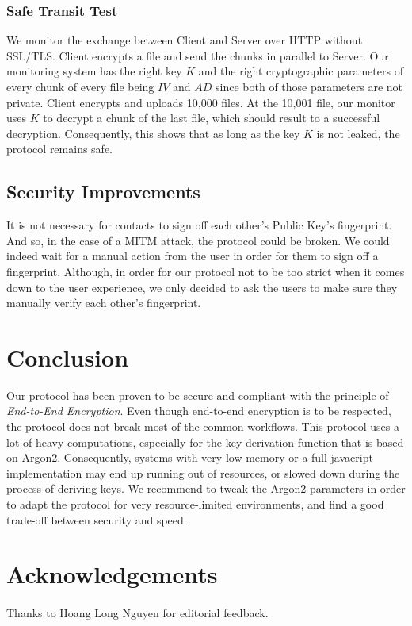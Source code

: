 \documentclass[a4paper,9pt,twoside]{article}
\begin{document}
\subsubsection{Safe Transit Test}

    We monitor the exchange between Client and Server over HTTP without SSL/TLS. Client encrypts 
a file and send the chunks in parallel to Server. Our monitoring system has the right key $K$ and the right 
cryptographic parameters of every chunk of every file being $IV$ and $AD$ since both of those parameters are not private. Client 
encrypts and uploads 10,000 files. At the 10,001 file, our monitor uses $K$ to decrypt a chunk of the last file, 
which should result to a successful decryption. Consequently, this shows that as long as the key $K$ is not leaked, 
the protocol remains safe.

\subsection{Security Improvements}

    It is not necessary for contacts to sign off each other's Public Key's fingerprint. And so, in the case of a 
MITM attack, the protocol could be broken. We could indeed wait for a manual action 
from the user in order for them to sign off a fingerprint. Although, in order for our protocol not to be 
too strict when it comes down to the user experience, we only decided to ask the users to make sure 
they manually verify each other's fingerprint.

\section{Conclusion}

    Our protocol has been proven to be secure and compliant with the principle of 
\emph{End-to-End Encryption}. Even though end-to-end encryption is to be 
respected, the protocol does not break most of the common workflows. This protocol 
uses a lot of heavy computations, especially for the key derivation function that is based 
on Argon2. Consequently, systems with very low memory or a full-javacript implementation may end up running out of 
resources, or slowed down during the process of deriving keys. We recommend to 
tweak the Argon2 parameters in order to adapt the protocol for very resource-limited environments, 
and find a good trade-off between security and speed.

\section{Acknowledgements}

\paragraph{}
Thanks to Hoang Long Nguyen for editorial feedback.



\end{document}
